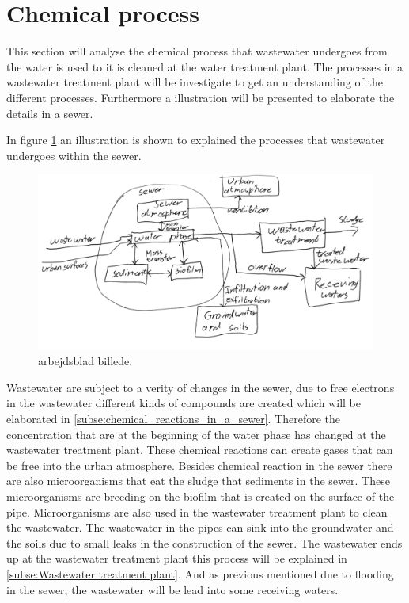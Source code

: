 \section{Chemical process}\label{se:chemical_process}
This section will analyse the chemical process that wastewater undergoes from the water is used to it is cleaned at the water treatment plant. The processes in a wastewater treatment plant will be investigate to get an understanding of the different processes. Furthermore a illustration will be presented to elaborate the details in a sewer. 

In figure \ref{fig:sewer_overview_of_the_different_parts} an illustration is shown to explained the processes that wastewater undergoes within the sewer.
\begin{figure}[H]
\centering
\includegraphics[width=1\textwidth]{report/introduction/pictures/detailed_sewer.pdf}
\caption{arbejdsblad billede. }
\label{fig:sewer_overview_of_the_different_parts}
\end{figure}
Wastewater are subject to a verity of changes in the sewer, due to free electrons in the wastewater different kinds of compounds are created which will be elaborated in \ref{subse:chemical_reactions_in_a_sewer}. Therefore the concentration that are at the beginning of the water phase has changed at the wastewater treatment plant. These chemical reactions can create gases that can be free into the urban atmosphere. Besides chemical reaction in the sewer there are also microorganisms that eat the sludge that sediments in the sewer. These microorganisms are breeding on the biofilm that is created on the surface of the pipe. Microorganisms are also used in the wastewater treatment plant to clean the wastewater. The wastewater in the pipes can sink into the groundwater and the soils due to small leaks in the construction of the sewer. The wastewater ends up at the wastewater treatment plant this process will be explained in \ref{subse:Wastewater treatment plant}. And as previous mentioned due to flooding in the sewer, the wastewater will be lead into some receiving waters. 



